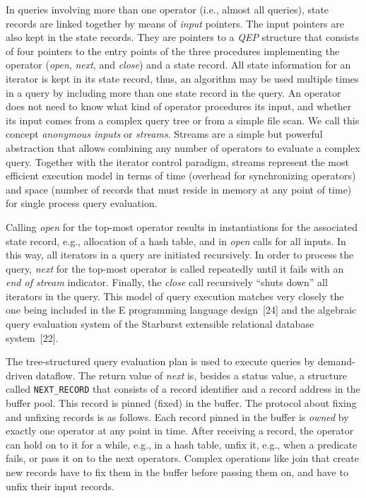 \documentclass[a4paper,12pt,notitlepage,twoside,openright]{article}
\begin{document}
In queries involving more than one operator (i.e.,
almost all queries), state records are linked together by
means of \emph{input} pointers. The input pointers are also kept
in the state records. They are pointers to a \emph{QEP} structure
that consists of four pointers to the entry points of the
three procedures implementing the operator (\emph{open}, \emph{next}, and
\emph{close}) and a state record. All state information for an
iterator is kept in its state record, thus, an algorithm may
be used multiple times in a query by including more than
one state record in the query. An operator does not need
to know what kind of operator procedures its input, and
whether its input comes from a complex query tree or from
a simple file scan. We call this concept \emph{anonymous inputs}
or \emph{streams}. Streams are a simple but powerful abstraction
that allows combining any number of operators to evaluate
a complex query. Together with the iterator control paradigm,
streams represent the most efficient execution model
in terms of time (overhead for synchronizing operators) and
space (number of records that must reside in memory at
any point of time) for single process query evaluation.

Calling \emph{open} for the top-most operator results in
instantiations for the associated state record, e.g., allocation
of a hash table, and in \emph{open} calls for all inputs. In this
way, all iterators in a query are initiated recursively. In
order to process the query, \emph{next} for the top-most operator is
called repeatedly until it fails with an \emph{end of stream} indicator.
Finally, the \emph{close} call recursively ``shuts down'' all
iterators in the query. This model of query execution
matches very closely the one being included in the E programming
language design~{[24]} and the algebraic query
evaluation system of the Starburst extensible relational database system~{[22]}.

The tree-structured query evaluation plan is used to
execute queries by demand-driven dataflow. The return
value of \emph{next} is, besides a status value, a structure called
\texttt{NEXT\_RECORD} that consists of a record identifier and a
record address in the buffer pool. This record is pinned
(fixed) in the buffer. The protocol about fixing and unfixing
records is as follows. Each record pinned in the buffer
is \emph{owned} by exactly one operator at any point in time.
After receiving a record, the operator can hold on to it for
a while, e.g., in a hash table, unfix it, e.g., when a predicate
fails, or pass it on to the next operators. Complex
operations like join that create new records have to fix
them in the buffer before passing them on, and have to
unfix their input records.
\end{document}
